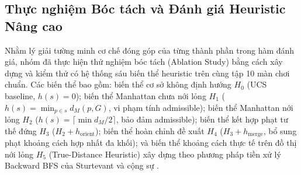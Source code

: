 \subsection{Thực nghiệm Bóc tách và Đánh giá Heuristic Nâng cao}
\label{subsec:ablation_study}

Nhằm lý giải tường minh cơ chế đóng góp của từng thành phần trong hàm
đánh giá, nhóm đã thực hiện thử nghiệm bóc tách (Ablation Study) bằng cách
xây dựng và kiểm thử có hệ thống sáu biến thể heuristic trên cùng tập
10 màn chơi chuẩn. Các biến thể bao gồm: biến thể cơ sở không định hướng
$H_0$ (UCS baseline, $h(s)=0$); biến thể Manhattan chưa nới lỏng $H_1$
($h(s) = \min_{p \in s} d_M(p, G)$, vi phạm tính admissible); biến thể
Manhattan nới lỏng $H_2$ ($h(s) = \lceil \min d_M / 2 \rceil$, bảo đảm
admissible); biến thể kết hợp phạt tư thế đứng $H_3$
($H_2 + h_{\text{orient}}$); biến thể hoàn chỉnh đề xuất $H_4$
($H_3 + h_{\text{merge}}$, bổ sung phạt khoảng cách hợp nhất đa khối);
và biến thể khoảng cách thực tế trên đồ thị
nới lỏng $H_5$ (True-Distance Heuristic) xây dựng theo phương pháp tiền xử lý
Backward BFS của Sturtevant và cộng sự \cite{sturtevant2009memory}.

\begin{table}[H]
\centering
\caption{Kết quả tổng hợp thực nghiệm bóc tách 6 biến thể Heuristic
trên 10 màn chơi}
\label{tab:ablation_summary}
\end{table}

